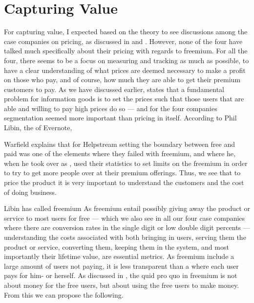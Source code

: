 \section{Capturing Value}

For capturing value, I expected based on the theory to see discussions among the case companies on pricing, \eg as discussed in  and . However, none of the four have talked much specifically about their pricing with regards to freemium. For all the four, there seems to be a focus on measuring and tracking as much as possible, to have a clear understanding of what prices are deemed necessary to make a profit on those who pay, and of course, how much they are able to get their premium customers to pay. As we have discussed earlier, \citet{varian1997} states that a fundamental problem for information goods is to set the prices such that those users that are able and willing to pay high prices do so --- and for the four companies segmentation seemed more important than pricing in itself. According to Phil Libin, the  of Evernote, 

Warfield explains that for Helpstream setting the boundary between free and paid was one of the elements where they failed with freemium, and where he, when he took over as , used their statistics to set limits on the freemium in order to try to get more people over at their premium offerings. Thus, we see that to price the product it is very important to understand the customers and the cost of doing business.

Libin has called freemium  As freemium entail possibly giving away the product or service to most users for free --- which we also see in all our four case companies where there are conversion rates in the single digit or low double digit percents --- understanding the costs associated with both bringing in users, serving them the product or service, converting them, keeping them in the system, and most importantly their lifetime value, are essential metrics. As freemium include a large amount of users not paying, it is less transparent than a  where each user pays for him- or herself. As discussed in , the quid pro quo in freemium is not about money for the free users, but about using the free users to make money. From this we can propose the following.


